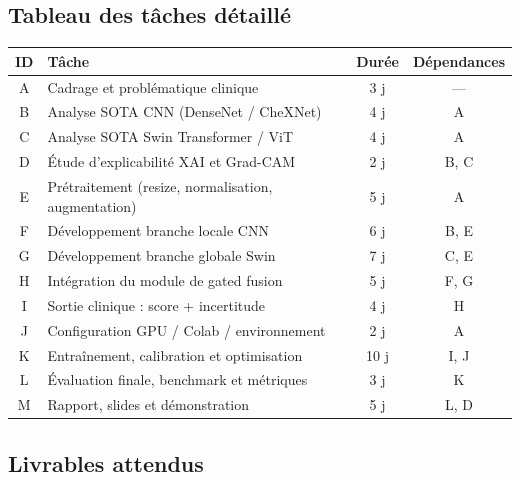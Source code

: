 \documentclass[a4paper,12pt]{article}
\begin{document}
\subsection{Tableau des tâches détaillé}

\renewcommand{\arraystretch}{1.25}
\begin{tabularx}{\linewidth}{@{}c X c c@{}}
  \toprule
  \textbf{ID} & \textbf{Tâche} & \textbf{Durée} & \textbf{Dépendances} \\
  \midrule
  A & Cadrage et problématique clinique & 3 j & — \\
  \rowcolor{grisClair}
  B & Analyse SOTA CNN (DenseNet / CheXNet) & 4 j & A \\
  C & Analyse SOTA Swin Transformer / ViT & 4 j & A \\
  \rowcolor{grisClair}
  D & Étude d'explicabilité XAI et Grad-CAM & 2 j & B, C \\
  E & Prétraitement (resize, normalisation, augmentation) & 5 j & A \\
  \rowcolor{grisClair}
  F & Développement branche locale CNN & 6 j & B, E \\
  G & Développement branche globale Swin & 7 j & C, E \\
  \rowcolor{grisClair}
  H & Intégration du module de gated fusion & 5 j & F, G \\
  I & Sortie clinique : score + incertitude & 4 j & H \\
  \rowcolor{grisClair}
  J & Configuration GPU / Colab / environnement & 2 j & A \\
  K & Entraînement, calibration et optimisation & 10 j & I, J \\
  \rowcolor{grisClair}
  L & Évaluation finale, benchmark et métriques & 3 j & K \\
  M & Rapport, slides et démonstration & 5 j & L, D \\
  \bottomrule
\end{tabularx}

\vspace{0.4cm}

\noindent{}

\subsection{Livrables attendus}
\end{document}
